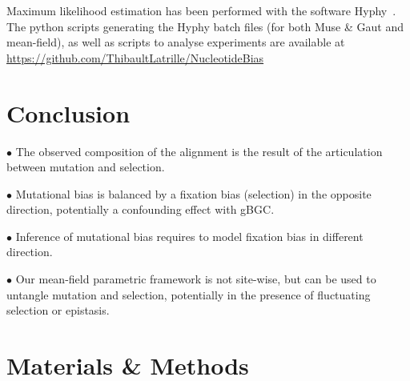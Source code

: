 Maximum likelihood estimation has been performed with the software Hyphy~\citep{Pond2005}.
The python scripts generating the Hyphy batch files (for both Muse \& Gaut and mean-field), as well as scripts to analyse experiments are available at \url{https://github.com/ThibaultLatrille/NucleotideBias}

\section{Conclusion}

$\bullet$ The observed composition of the alignment is the result of the articulation between mutation and selection.

$\bullet$ Mutational bias is balanced by a fixation bias (selection) in the opposite direction, potentially a confounding effect with gBGC.

$\bullet$ Inference of mutational bias requires to model fixation bias in different direction.

$\bullet$ Our mean-field parametric framework is not site-wise, but can be used to untangle mutation and selection, potentially in the presence of fluctuating selection or epistasis.

\section{Materials \& Methods}


